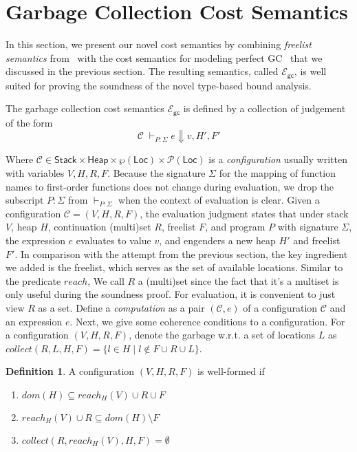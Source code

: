 \documentclass{easychair}
\newcommand{\ms}[1]{\ensuremath{\mathsf{#1}}}
\newcommand{\gcSem}{\ensuremath{\mathcal{E}_{\ms{gc}}}}
\theoremstyle{definition}
\newtheorem{definition}{Definition}
\begin{document}

\section{Garbage Collection Cost Semantics}
\label{sect:semantics}

In this section, we present our novel cost semantics by combining
\emph{freelist semantics} from~\cite{Hofmann:2003:SPH:604131.604148}
with the cost semantics for modeling perfect
GC~\cite{DBLP:journals/entcs/Minamide99} that we discussed in the
previous section. The resulting semantics, called \gcSem, is well suited for
proving the soundness of the novel type-based bound analysis.

The garbage collection cost semantics \gcSem{} is defined by a collection of judgement of the form
\[
\mathcal{C} \; \vdash_{P : \Sigma} e \Downarrow v, H', F'
\]

Where $\mathcal{C} \in \ms{Stack} \times \ms{Heap} \times
\wp(\ms{Loc}) \times \mathcal{P}(\ms{Loc})$ is a \emph{configuration}
usually written with variables $V,H,R,F$. 
Because the signature $\Sigma$ for the mapping of function names to first-order functions 
does not change during evaluation, we drop the subscript $P:\Sigma$ from $\vdash_{P:\Sigma}$ 
when the context of evaluation is clear. Given a configuration $\mathcal{C} = (V,H,R,F)$,
the evaluation judgment states that under stack $V$, heap $H$, continuation (multi)set $R$,
freelist $F$, and program $P$ with signature $\Sigma$, the expression $e$ evaluates to value $v$, 
and engenders a new heap $H'$ and freelist $F'$. In comparison with the attempt from 
the previous section, the key ingredient we added is the freelist, which serves 
as the set of available locations. Similar to the predicate $reach$, 
We call $R$ a (multi)set since the fact that 
it's a multiset is only useful during the soundness proof. For evaluation, it is 
convenient to just view $R$ as a set. Define a \emph{computation} as a pair
$(\mathcal{C},e)$ of a configuration $\mathcal{C}$ and an expression $e$.
Next, we give some coherence conditions to a configuration.
For a configuration $(V,H,R,F)$, denote the
garbage w.r.t. a set of locations $L$ 
as $collect(R,L,H,F) = \{l \in H \mid l \notin F \cup R \cup L\}$.

\begin{definition} A configuration $(V,H,R,F)$ is well-formed if 
	\begin{enumerate}
		\item $dom(H) \subseteq reach_H(V) \cup R \cup F$
		\item $reach_H(V) \cup R \subseteq dom(H) \setminus F$
		\item $collect(R,reach_H(V),H,F) = \emptyset$
	\end{enumerate}
\end{definition}
\end{document}
